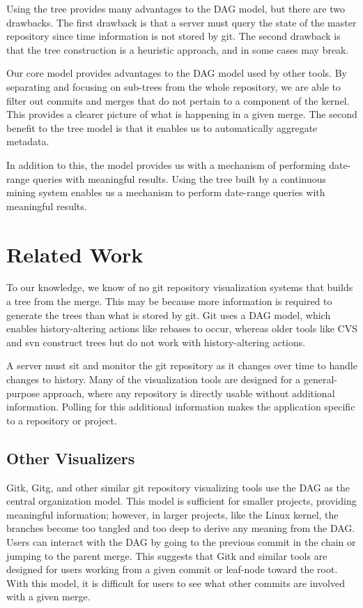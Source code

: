\documentclass[conference, draftclsnofoot]{IEEEtran}
\begin{document}
Using the tree provides many advantages to the DAG model, but there are two
drawbacks. The first drawback is that a server must query the state of the master
repository since time information is not stored by git. The second drawback is that
the tree construction is a heuristic approach, and in some cases may break.

Our core model provides advantages to the DAG model used by other tools. By
separating and focusing on sub-trees from the whole repository, we are able to
filter out commits and merges that do not pertain to a component of the kernel. This
provides a clearer picture of what is happening in a given merge. The second benefit
to the tree model is that it enables us to automatically aggregate metadata.

In addition to this, the model provides us with a mechanism of performing date-range
queries with meaningful results. Using the tree built by a continuous mining system
enables us a mechanism to perform date-range queries with meaningful results.


\section{Related Work}

To our knowledge, we know of no git repository visualization systems that builds a
tree from the merge. This may be because more information is required to generate
the trees than what is stored by git. Git uses a DAG model, which enables
history-altering actions like rebases to occur, whereas older tools like CVS and svn
construct trees\cite{CVS2008} but do not work with history-altering actions.

A server must sit and monitor the git repository as it changes over time to handle
changes to history. Many of the visualization tools are designed for a
general-purpose approach, where any repository is directly usable without additional
information. Polling for this additional information makes the application specific
to a repository or project.

\subsection{Other Visualizers}

Gitk, Gitg, and other similar git repository visualizing tools use the DAG as the
central organization model. This model is sufficient for smaller projects, providing
meaningful information; however, in larger projects, like the Linux kernel, the
branches become too tangled and too deep to derive any meaning from the DAG. Users
can interact with the DAG by going to the previous commit in the chain or jumping to
the parent merge. This suggests that Gitk and similar tools are designed for users
working from a given commit or leaf-node toward the root. With this model, it is
difficult for users to see what other commits are involved with a given merge.
\end{document}
